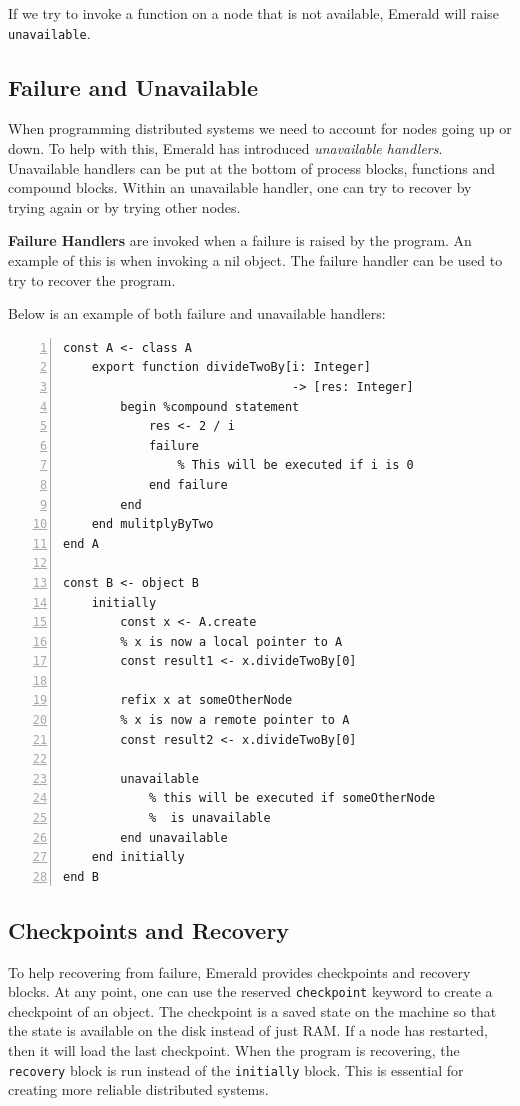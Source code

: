If we try to invoke a function on a node that is not available, Emerald will raise \verb|unavailable|.




\subsection{Failure and Unavailable}
When programming distributed systems we need to account for nodes going up or down. To help with this, Emerald has introduced \textit{unavailable handlers}. Unavailable handlers can be put at the bottom of process blocks, functions and compound blocks. Within an unavailable handler, one can try to recover by trying again or by trying other nodes.

\textbf{Failure Handlers} are invoked when a failure is raised by the program. An example of this is when invoking a nil object. The failure handler can be used to try to recover the program.

Below is an example of both failure and unavailable handlers:
\begin{lstlisting}[language=emerald, numbers=left]
const A <- class A
    export function divideTwoBy[i: Integer] 
                                -> [res: Integer]
        begin %compound statement
            res <- 2 / i
            failure
                % This will be executed if i is 0
            end failure
        end
    end mulitplyByTwo
end A

const B <- object B
    initially
        const x <- A.create
        % x is now a local pointer to A
        const result1 <- x.divideTwoBy[0]
        
        refix x at someOtherNode
        % x is now a remote pointer to A
        const result2 <- x.divideTwoBy[0]
        
        unavailable
            % this will be executed if someOtherNode
            %  is unavailable
        end unavailable
    end initially
end B
\end{lstlisting}






\subsection{Checkpoints and Recovery}
To help recovering from failure, Emerald provides checkpoints and recovery blocks. At any point, one can use the reserved \verb|checkpoint| keyword to create a checkpoint of an object. The checkpoint is a saved state on the machine so that the state is available on the disk instead of just RAM. If a node has restarted, then it will load the last checkpoint. When the program is recovering, the \verb|recovery| block is run instead of the \verb|initially| block. This is essential for creating more reliable distributed systems.



